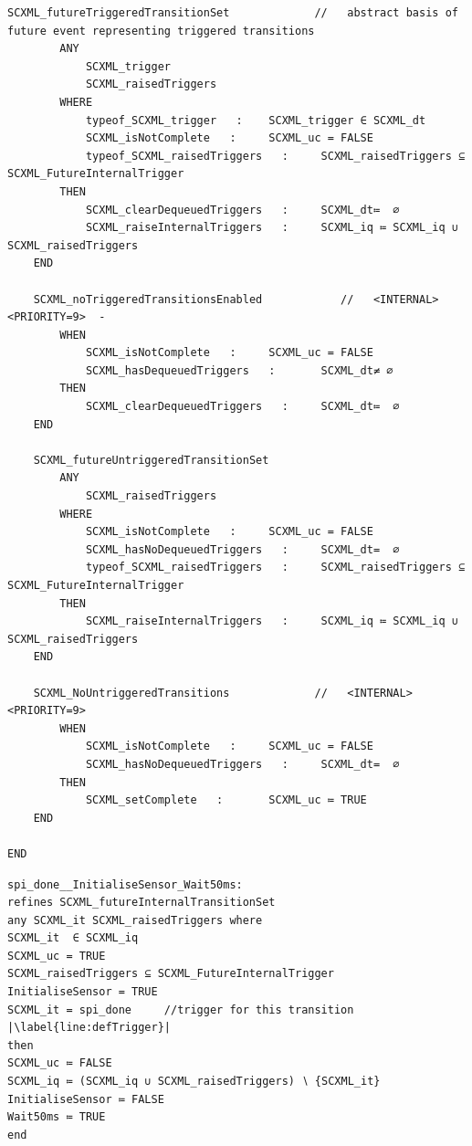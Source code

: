 \begin{lstfloat}[!tb]
\begin{lstlisting}[caption={Abstract basis machine (part of)}, label={lst:BasisMachine},language=Event-B, escapechar=|, frame=single, basicstyle=\rmfamily\scriptsize, belowskip=-2.0 \baselineskip]
	SCXML_futureTriggeredTransitionSet      	   //   abstract basis of future event representing triggered transitions
		ANY
			SCXML_trigger
			SCXML_raisedTriggers
		WHERE
			typeof_SCXML_trigger   :   	SCXML_trigger ∈ SCXML_dt
			SCXML_isNotComplete   :   	SCXML_uc = FALSE
			typeof_SCXML_raisedTriggers   :   	SCXML_raisedTriggers ⊆ SCXML_FutureInternalTrigger
		THEN
			SCXML_clearDequeuedTriggers   :   	SCXML_dt≔  ∅
			SCXML_raiseInternalTriggers   :   	SCXML_iq ≔ SCXML_iq ∪ SCXML_raisedTriggers
	END

	SCXML_noTriggeredTransitionsEnabled      	   //   <INTERNAL><PRIORITY=9>  - 
		WHEN
			SCXML_isNotComplete   :   	SCXML_uc = FALSE
			SCXML_hasDequeuedTriggers   :   	SCXML_dt≠ ∅
		THEN
			SCXML_clearDequeuedTriggers   :   	SCXML_dt≔  ∅
	END

	SCXML_futureUntriggeredTransitionSet      
		ANY
			SCXML_raisedTriggers
		WHERE
			SCXML_isNotComplete   :   	SCXML_uc = FALSE
			SCXML_hasNoDequeuedTriggers   :   	SCXML_dt=  ∅
			typeof_SCXML_raisedTriggers   :   	SCXML_raisedTriggers ⊆ SCXML_FutureInternalTrigger
		THEN
			SCXML_raiseInternalTriggers   :   	SCXML_iq ≔ SCXML_iq ∪ SCXML_raisedTriggers
	END

	SCXML_NoUntriggeredTransitions      	   //   <INTERNAL><PRIORITY=9>
		WHEN
			SCXML_isNotComplete   :   	SCXML_uc = FALSE
			SCXML_hasNoDequeuedTriggers   :   	SCXML_dt=  ∅
		THEN
			SCXML_setComplete   :   	SCXML_uc ≔ TRUE
	END

END
\end{lstlisting}
\end{lstfloat}

\begin{lstfloat}[!tb]
\begin{lstlisting}[caption={Event-B event corresponding to internal triggered transition to \textbf{Wait50ms} state in refinement level 1 shown in Fig.~\ref{fig:ASIC}}, label={lst:SecBotMach0},language=Event-B, escapechar=|, frame=single, belowskip=-2.0 \baselineskip]
spi_done__InitialiseSensor_Wait50ms:	
refines SCXML_futureInternalTransitionSet 
any SCXML_it SCXML_raisedTriggers where
SCXML_it  ∈ SCXML_iq 
SCXML_uc = TRUE
SCXML_raisedTriggers ⊆ SCXML_FutureInternalTrigger
InitialiseSensor = TRUE
SCXML_it = spi_done  	//trigger for this transition |\label{line:defTrigger}|
then
SCXML_uc ≔ FALSE
SCXML_iq ≔ (SCXML_iq ∪ SCXML_raisedTriggers) ∖ {SCXML_it}
InitialiseSensor ≔ FALSE
Wait50ms ≔ TRUE
end
\end{lstlisting}
\end{lstfloat}